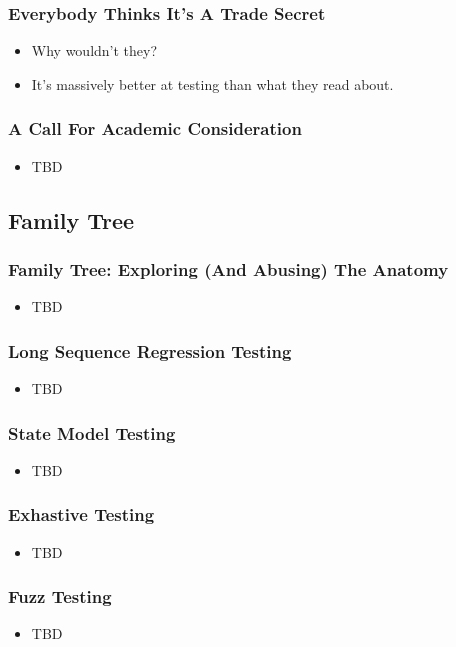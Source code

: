\begin{frame}
  \frametitle{Everybody Thinks It's A Trade Secret}
  \begin{itemize}
    \item Why wouldn't they?
    \item It's massively better at testing than what they read about.
  \end{itemize}
\end{frame}

\begin{frame}
  \frametitle{A Call For Academic Consideration}
  \begin{itemize}
    \item TBD
  \end{itemize}
\end{frame}

\subsection{Family Tree}

\begin{frame}
  \frametitle{Family Tree: Exploring (And Abusing) The Anatomy}
  \begin{itemize}
    \item TBD
  \end{itemize}
\end{frame}

\begin{frame}
  \frametitle{Long Sequence Regression Testing}
  \begin{itemize}
    \item TBD
  \end{itemize}
\end{frame}

\begin{frame}
  \frametitle{State Model Testing}
  \begin{itemize}
    \item TBD
  \end{itemize}
\end{frame}

\begin{frame}
  \frametitle{Exhastive Testing}
  \begin{itemize}
    \item TBD
  \end{itemize}
\end{frame}

\begin{frame}
  \frametitle{Fuzz Testing}
  \begin{itemize}
    \item TBD
  \end{itemize}
\end{frame}

